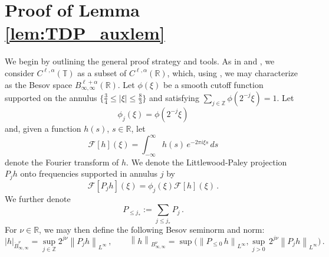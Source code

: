 \documentclass[11pt,reqno]{amsart}
\newcommand{\R}{\mathbb{R}}
\newcommand{\Z}{\mathbb{Z}}
\newcommand{\T}{\mathbb{T}}
\newcommand{\abs}[1]{\left\lvert #1 \right\rvert}
\newcommand{\norm}[1]{\left\lVert #1 \right\rVert}
\newcommand{\mc}[1]{\mathcal{#1}}
\theoremstyle{definition}
\begin{document}
 


\section{Proof of Lemma \ref{lem:TDP_auxlem}}\label{sec:TDP_auxlem_pf}
We begin by outlining the general proof strategy and tools. As in \cite[section 2]{ohm2025angle} and \cite[section 3]{ohm2024free}, we consider $C^{\ell,\alpha}(\T)$ as a subset of $C^{\ell,\alpha}(\R)$, which, using \cite[Theorem 2.36]{bahouri2011fourier}, we may characterize as the Besov space $B^{\ell+\alpha}_{\infty,\infty}(\R)$. 
%
Let $\phi(\xi)$ be a smooth cutoff function supported on the annulus $\{\frac{3}{4}\le \abs{\xi}\le \frac{8}{3}\}$ and satisfying $\sum_{j\in\Z}\phi(2^{-j}\xi)=1$. Let 
\begin{equation}\label{eq:dyadic_phi}
\phi_j(\xi) = \phi(2^{-j}\xi)
\end{equation}
and, given a function $h(s)$, $s\in\R$, let
\begin{equation}
 \mc{F}[h](\xi) = \int_{-\infty}^\infty h(s)\,e^{-2\pi i \xi s}\, ds 
\end{equation}
denote the Fourier transform of $h$. We denote the Littlewood-Paley projection $P_jh$ onto frequencies supported in annulus $j$ by
\begin{equation}\label{eq:littlewood_p}
\mc{F}[P_j h](\xi)  = \phi_j(\xi)\mc{F}[h](\xi)\,.
\end{equation}
%
We further denote
\begin{equation}
P_{\le j_*} := \sum_{j\le j_*} P_j \,.
\end{equation}
%
%
For $\nu\in \R$, we may then define the following Besov seminorm and norm:
\begin{equation}\label{eq:besov}
|h|_{\dot B^\nu_{\infty,\infty}} = \sup_{j\in \Z} 2^{j\nu}\norm{P_j h}_{L^\infty}\,, \qquad
\norm{h}_{B^\nu_{\infty,\infty}} =\sup\big(\norm{P_{\le 0} \,h}_{L^\infty}, \sup_{j> 0} \,2^{j\nu}\norm{P_j h}_{L^\infty}\big)\,.
\end{equation}
\end{document}
